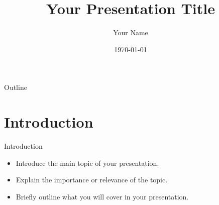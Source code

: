 \documentclass{beamer}
\title{Your Presentation Title}
\author{Your Name}
\institute{Your Institution}
\date{\today}
\begin{document}
\begin{frame}
    \titlepage
\end{frame}

\begin{frame}{Outline}
    \tableofcontents
\end{frame}

\section{Introduction}

\begin{frame}{Introduction}
    \begin{itemize}
        \item Introduce the main topic of your presentation.
        \item Explain the importance or relevance of the topic.
        \item Briefly outline what you will cover in your presentation.
    \end{itemize}
\end{frame}
\end{document}
